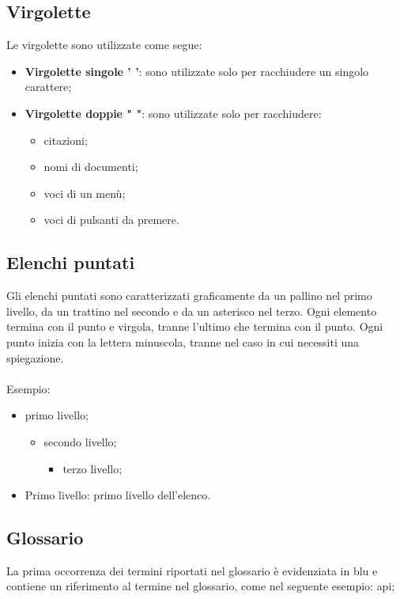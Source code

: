  \subsection{Virgolette}
 Le virgolette sono utilizzate come segue:
 \begin{itemize}
 	\item \textbf{Virgolette singole ' '}: sono utilizzate solo per racchiudere un singolo carattere;
 	\item \textbf{Virgolette doppie " "}: sono utilizzate solo per racchiudere:
 	\begin{itemize}
 		\item citazioni;
 		\item nomi di documenti;
 		\item voci di un menù;
 		\item voci di pulsanti da premere.
 	\end{itemize}
 \end{itemize}


\subsection{Elenchi puntati}
Gli elenchi puntati sono caratterizzati graficamente da un pallino nel primo livello, da un
trattino nel secondo e da un asterisco nel terzo.
Ogni elemento termina con il punto e virgola, tranne l'ultimo che termina con il punto. Ogni punto inizia con la lettera minuscola, tranne nel caso in cui necessiti una spiegazione.
\\
\\Esempio:
\begin{itemize}
	\item primo livello;
		\begin{itemize}
			\item secondo livello;
			\begin{itemize}
				\item terzo livello;
			\end{itemize}
		\end{itemize}
	\item Primo livello: primo livello dell'elenco.
\end{itemize}


\subsection{Glossario}
La prima occorrenza dei termini riportati nel glossario è evidenziata in blu e contiene un riferimento al termine nel glossario, come nel seguente esempio: \gls{api};
